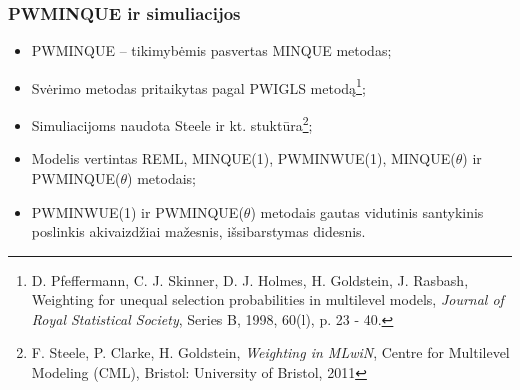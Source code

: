 \documentclass[utf8,hyperref={unicode,pdftex}]{beamer}
\begin{document}
\begin{frame}
\frametitle{PWMINQUE ir simuliacijos}
\begin{itemize}
\item PWMINQUE -- tikimybėmis pasvertas MINQUE metodas;
\item Svėrimo metodas pritaikytas pagal PWIGLS metodą\footnote{D. Pfeffermann, C. J. Skinner, D. J. Holmes, H. Goldstein, J. Rasbash, Weighting for unequal selection probabilities in multilevel models, \textit{Journal of Royal Statistical Society}, Series B, 1998, 60(l), p. 23 - 40.};
\item Simuliacijoms naudota Steele ir kt. stuktūra\footnote{F. Steele, P. Clarke, H. Goldstein, \textit{Weighting in MLwiN}, Centre for Multilevel Modeling (CML), Bristol: University of Bristol, 2011};
\item Modelis vertintas REML, MINQUE(1), PWMINWUE(1), MINQUE($\theta$) ir PWMINQUE($\theta$) metodais;
\item PWMINWUE(1) ir PWMINQUE($\theta$) metodais gautas vidutinis santykinis poslinkis akivaizdžiai mažesnis, išsibarstymas didesnis.
\end{itemize}
\end{frame}
\end{document}
